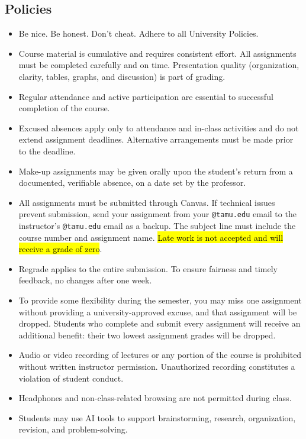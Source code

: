 \documentclass[10pt]{article}
\begin{document}
\subsection*{Policies}
\begin{itemize}[leftmargin=*,nosep]
\item Be nice. Be honest. Don’t cheat. Adhere to all University Policies.
\item Course material is cumulative and requires consistent effort. All assignments must be completed carefully and on time.
      Presentation quality (organization, clarity, tables, graphs, and discussion) is part of grading.
\item Regular attendance and active participation are essential to successful completion of the course.
\item Excused absences apply only to attendance and in-class activities and do not extend assignment deadlines.
      Alternative arrangements must be made prior to the deadline.
\item Make-up assignments may be given orally upon the student's return from a documented, verifiable absence, on a date set by the professor.
\item All assignments must be submitted through Canvas.
      If technical issues prevent submission, send your assignment from your \texttt{@tamu.edu} email to the instructor’s \texttt{@tamu.edu} email as a backup.
      The subject line must include the course number and assignment name.
      \hl{Late work is not accepted and will receive a grade of zero}.
\item Regrade applies to the entire submission. To ensure fairness and timely feedback, no changes after one week.
\item To provide some flexibility during the semester, you may miss one assignment without providing a university-approved excuse, and that assignment will be dropped. Students who complete and submit every assignment will receive an additional benefit: their two lowest assignment grades will be dropped.
\item Audio or video recording of lectures or any portion of the course is prohibited without written instructor permission.
      Unauthorized recording constitutes a violation of student conduct.
\item Headphones and non-class-related browsing are not permitted during class.
\item Students may use AI tools to support brainstorming, research, organization, revision, and problem-solving.

\end{itemize}
\end{document}
